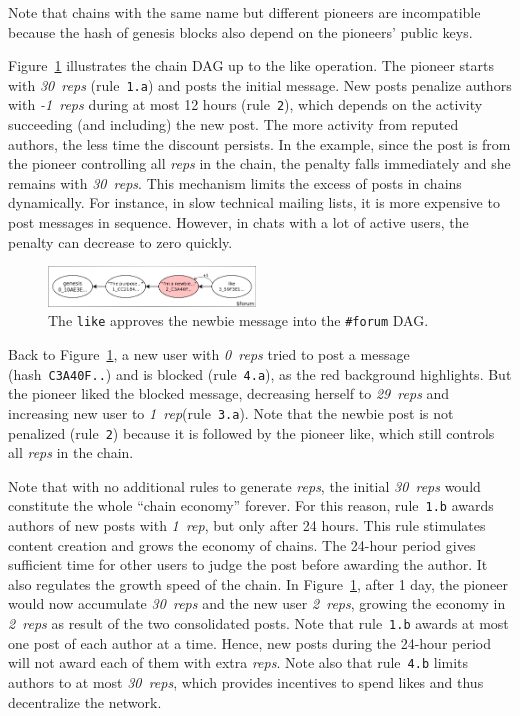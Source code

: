 \documentclass[10pt,journal,compsoc]{IEEEtran}
\newcommand{\reps}     {\emph{reps}\xspace}
\newcommand{\onerep}   {\emph{1~rep}\xspace}
\newcommand{\nreps}[1] {\emph{#1~reps\xspace}}
\newcommand{\code}[1]  {\texttt{\footnotesize{#1}}}
\begin{document}
Note that chains with the same name but different pioneers are incompatible
because the hash of genesis blocks also depend on the pioneers' public keys.

Figure~\ref{fig.forum} illustrates the chain DAG up to the like operation.
The pioneer starts with \nreps{30} (rule~\code{1.a}) and posts the initial
message.
%
New posts penalize authors with \nreps{-1} during at most 12 hours
(rule~\code{2}), which depends on the activity succeeding (and including) the
new post.
The more activity from reputed authors, the less time the discount persists.
In the example, since the post is from the pioneer controlling all \reps in the
chain, the penalty falls immediately and she remains with \nreps{30}.
This mechanism limits the excess of posts in chains dynamically.
For instance, in slow technical mailing lists, it is more expensive to post
messages in sequence.
However, in chats with a lot of active users, the penalty can decrease to zero
quickly.

\begin{figure}
\centering
\includegraphics[width=0.49\textwidth]{forum.png}
\caption{
    The \code{like} approves the newbie message into the \code{\#forum} DAG.
}
\label{fig.forum}
\end{figure}

Back to Figure~\ref{fig.forum}, a new user with \nreps{0} tried to post a
message (hash~\code{C3A40F..}) and is blocked (rule~\code{4.a}), as the red
background highlights.
But the pioneer liked the blocked message, decreasing herself to \nreps{29}
and increasing new user to \onerep (rule~\code{3.a}).
Note that the newbie post is not penalized (rule~\code{2}) because it is
followed by the pioneer like, which still controls all \reps in the chain.

Note that with no additional rules to generate \reps, the initial \nreps{30}
would constitute the whole ``chain economy'' forever.
For this reason, rule~\code{1.b} awards authors of new posts with \onerep,
but only after 24 hours.
This rule stimulates content creation and grows the economy of chains.
The 24-hour period gives sufficient time for other users to judge the post
before awarding the author.
It also regulates the growth speed of the chain.
In Figure~\ref{fig.forum}, after 1 day, the pioneer would now accumulate
\nreps{30} and the new user \nreps{2}, growing the economy in \nreps{2} as
result of the two consolidated posts.
Note that rule~\code{1.b} awards at most one post of each author at a time.
Hence, new posts during the 24-hour period will not award each of them with
extra \reps.
Note also that rule~\code{4.b} limits authors to at most \nreps{30}, which
provides incentives to spend likes and thus decentralize the network.
\end{document}
